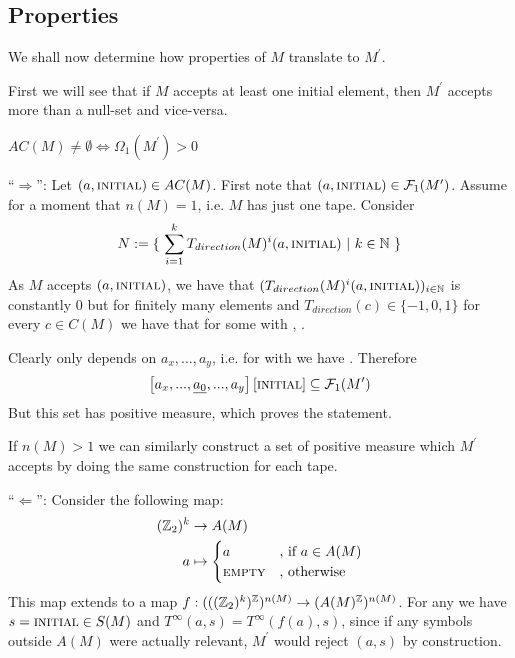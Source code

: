 \subsection{Properties}

We shall now determine how properties of $M$ translate to $M^\prime$.

First we will see that if $M$ accepts at least one initial element, then $M^\prime$ accepts more than a null-set and vice-versa.
\begin{Lemma}
	\label{tm_to_tds:properties:lemma_fundamental_value}
	$AC(M) \neq \emptyset \Leftrightarrow \Omega_1(M^\prime) > 0$
\end{Lemma}
\proof
	``$\Rightarrow$'':
	Let $(a,\text{\scshape{initial}}) \in AC(M)$.
	First note that $(a,\text{\scshape{initial}}) \in \mathcal{F}_1(M^\prime)$.
	Assume for a moment that $n(M) = 1$, i.e. $M$ has just one tape. Consider
	\begin{align*}
		N := \{~ \sum_{i=1}^k T_{direction}(M)^i(a,\text{\scshape{initial}})~|~k \in \mathbb{N} ~\}
	\end{align*}
	As $M$ accepts $(a,\text{\scshape{initial}})$, we have that $(T_{direction}(M)^i(a,\text{\scshape{initial}}))_{i \in \mathbb{N}}$ is constantly $0$ but for finitely many elements
	and $T_{direction}(c) \in \{-1,0,1\}$ for every $c \in C(M)$
	we have that  for some  with , .
	
	Clearly  only depends on $a_x,...,a_y$, i.e. for  with  we have . Therefore
	\begin{align*}
		\left [ a_x,...,\underline{a_0},...,a_y \right ] \left [\text{\scshape{initial}} \right ] \subseteq \mathcal{F}_1(M^\prime)
	\end{align*}
	But this set has positive measure, which proves the statement.

	If $n(M) > 1$ we can similarly construct a set of positive measure which $M^\prime$ accepts by doing the same construction for each tape.

	``$\Leftarrow$'':
		Consider the following map:
		\begin{align*}
			(\mathbb{Z}_2)^k &\to A(M) \\
			a &\mapsto
			\begin{cases}
				a &\text{, if}~ a \in A(M) \\
				\text{\scshape{empty}} &\text{, otherwise}
			\end{cases}
		\end{align*}
		This map extends to a map $f: (((\mathbb{Z}_2)^k)^{\mathbb{Z}})^{n(M)} \to (A(M)^{\mathbb{Z}})^{n(M)}$.
		For any  we have $s = \text{\scshape{initial}} \in S(M)$ and $T^\infty(a,s) = T^\infty(f(a),s)$, since if any symbols outside $A(M)$ were actually relevant, $M^\prime$ would reject $(a,s)$ by construction.

